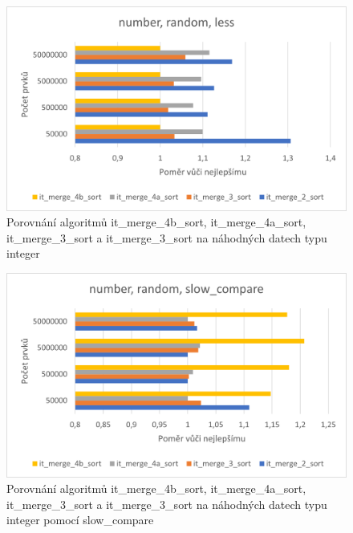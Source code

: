 \documentclass[thesis=B,czech]{FITthesis}[2019/12/23]
\begin{document}
\begin{figure}[htbp]\centering
	\includegraphics{obrazky/graf18.png}
	\caption[Porovnání algoritmů it\_merge\_4b\_sort, it\_merge\_4a\_sort,\linebreak it\_merge\_3\_sort a it\_merge\_3\_sort na náhodných datech typu integer]{Porovnání algoritmů it\_merge\_4b\_sort, it\_merge\_4a\_sort, it\_merge\_3\_sort a it\_merge\_3\_sort na náhodných datech typu integer}\label{fig:graf18}
\end{figure}

\begin{figure}[htbp]\centering
	\includegraphics{obrazky/graf19.png}
	\caption[Porovnání algoritmů it\_merge\_4b\_sort, it\_merge\_4a\_sort,\linebreak it\_merge\_3\_sort a it\_merge\_3\_sort na náhodných datech typu integer pomocí slow\_compare]{Porovnání algoritmů it\_merge\_4b\_sort, it\_merge\_4a\_sort, it\_merge\_3\_sort a it\_merge\_3\_sort na náhodných datech typu integer pomocí slow\_compare}\label{fig:graf19}
\end{figure}
\end{document}
